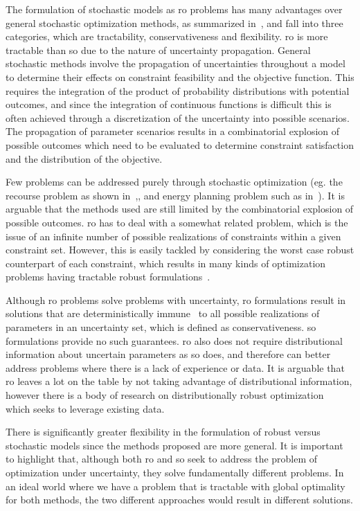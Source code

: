 The formulation of stochastic models as \gls{ro} problems has many advantages
over general stochastic optimization methods, as summarized in~\cite{Bertsimas2011},
and fall into three categories, which are tractability, conservativeness and flexibility.
\gls{ro} is more tractable than \gls{so} due to the nature of uncertainty propagation.
General stochastic methods involve the propagation of uncertainties throughout a model
to determine their effects on constraint feasibility and the objective function.
This requires the integration of the product of probability distributions with potential outcomes,
and since the integration of continuous functions is difficult this is often achieved through
a discretization of the uncertainty into possible scenarios. The propagation of parameter
scenarios results in a combinatorial explosion of possible outcomes which need to be evaluated to determine constraint
satisfaction and the distribution of the objective.

Few problems can be addressed purely through stochastic optimization (eg. the recourse problem as
shown in~\cite{Kall1982},\cite{Higle1991}, and energy planning problem such as in~\cite{Pereira1991}).
It is arguable that the methods used are still limited by the combinatorial
explosion of possible outcomes. \gls{ro} has to deal with a somewhat related problem, which is the issue of an infinite number
of possible realizations of constraints within a given constraint set. However, this is easily
tackled by considering the worst case robust counterpart of each constraint, which
results in many kinds of optimization problems having tractable robust formulations~\cite{Bertsimas2011}.

Although \gls{ro} problems solve problems with uncertainty,
\gls{ro} formulations result in solutions that are deterministically immune~\cite{Bertsimas2011}
to all possible realizations of parameters in an uncertainty set, which is defined as conservativeness.
\gls{so} formulations
provide no such guarantees. \gls{ro} also does not require distributional information
about uncertain parameters as \gls{so} does, and therefore can better address problems where there
is a lack of experience or data. It is arguable that \gls{ro}
leaves a lot on the table by not taking advantage of distributional information,
however there is a body of research on distributionally robust optimization~\cite{Bertsimas2013}
which seeks to leverage existing data.

There is significantly greater flexibility in the formulation of robust versus stochastic models
since the methods proposed are more general. It is important to highlight that,
although both \gls{ro} and \gls{so} seek to address the problem
of optimization under uncertainty, they solve fundamentally different problems. In an ideal world where
we have a problem that is tractable with global optimality for both methods, the two different
approaches would result in different solutions.

